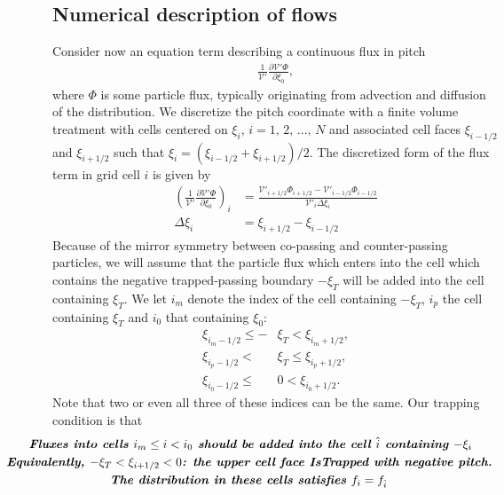 \documentclass[11pt,a4paper]{article}
\begin{document}
\subsection*{Numerical description of flows}
Consider now an equation term describing a continuous flux in pitch
\begin{align}
\frac{1}{\mathcal{V}'}\frac{\partial \mathcal{V}' \Phi}{\partial \xi_0} ,
\end{align}
where $\Phi$ is some particle flux, typically originating from advection and diffusion of the distribution. We discretize the pitch coordinate with a finite volume treatment with cells centered on $\xi_i$, $i=1,\,2,\,...,\,N$ and associated cell faces $\xi_{i-1/2}$ and $\xi_{i+1/2}$ such that $\xi_i = (\xi_{i-1/2} + \xi_{i+1/2})/2$. The discretized form of the flux term in grid cell $i$ is given by
\begin{align}
\left(\frac{1}{\mathcal{V}'}\frac{\partial \mathcal{V}' \Phi}{\partial \xi_0} \right)_i 
	&= \frac{\mathcal{V}'_{i+1/2}\Phi_{i+1/2} - \mathcal{V}'_{i-1/2}\Phi_{i-1/2}}{\mathcal{V}'_i \Delta \xi_i} \\
\Delta \xi_i &= \xi_{i+1/2}-\xi_{i-1/2}
\end{align}
Because of the mirror symmetry between co-passing and counter-passing particles, we will assume that the particle flux which enters into the cell which contains the negative trapped-passing boundary $-\xi_T$ will be added into the cell containing $\xi_T$. We let $i_m$ denote the index of the cell containing $-\xi_T$, $i_p$ the cell containing $\xi_T$ and $i_0$ that containing $\xi_0$:
\begin{align}
\xi_{i_m-1/2} \leq -&\xi_T < \xi_{i_m+1/2}, \nonumber \\
\xi_{i_p-1/2} < {} & \xi_T \leq \xi_{i_p+1/2}, \nonumber \\
\xi_{i_0-1/2} \leq{} &0 < \xi_{i_0+1/2}.
\end{align}
Note that two or even all three of these indices can be the same. Our trapping condition is that
\begin{align*}
&\hspace{-7mm} \textbf{\emph{Fluxes into cells $i_m \leq i < i_0$ should be added into the cell $\hat{i}$ containing $-\xi_i$}} \\
& \hspace{-15mm}\textbf{\emph{ Equivalently, $- \xi_T < \xi_{i+1/2} < 0$: the upper cell face IsTrapped with negative pitch. }} \\
& \hspace{15mm} \textbf{\emph{ The distribution in these cells satisfies $f_i = f_{\hat i}$ }}
\end{align*}
\end{document}
